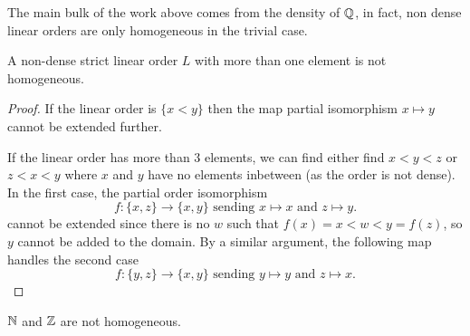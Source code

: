 The main bulk of the work above comes from the density of $\mathbb{Q}$, in fact, non dense linear orders are
only homogeneous in the trivial case.

\begin{prop}
  A non-dense strict linear order $L$ with more than one element is not homogeneous.
\end{prop}
\begin{proof}
  If the linear order is $\{x < y\}$ then the map partial isomorphism
  $x \mapsto y$ cannot be extended further.

  If the linear order has more than 3 elements, we can find either find $x < y < z$ or
  $z < x < y$ where $x$ and $y$ have no elements inbetween (as the order is not dense). In the first
  case, the partial order isomorphism
  \begin{equation*}
    f : \{x,z\} \to \{x,y\} \text{ sending } x \mapsto x \text{ and } z \mapsto y.
  \end{equation*}
  cannot be extended since there is no $w$ such that $f(x) = x < w < y = f(z)$, so $y$ cannot be
  added to the domain. By a similar argument, the following map handles the second case
  \begin{equation*}
    f : \{y,z\} \to \{x,y\} \text{ sending } y \mapsto y \text{ and } z \mapsto x.
  \end{equation*}
\end{proof}

\begin{cor}
  $\mathbb{N}$ and $\mathbb{Z}$ are not homogeneous.
\end{cor}





